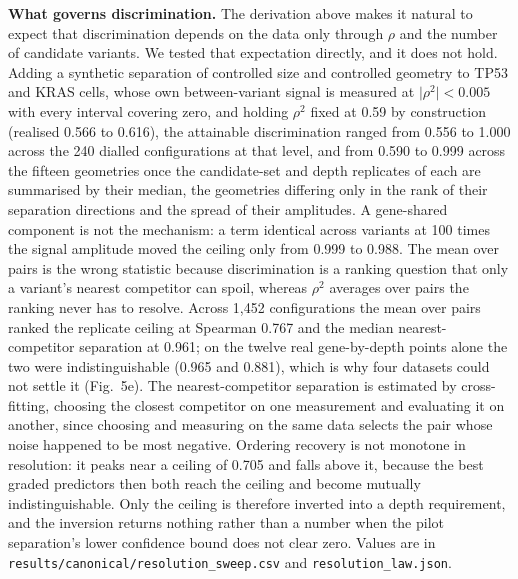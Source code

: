 \documentclass[11pt,letterpaper]{article}
\begin{document}
\textbf{What governs discrimination.} The derivation above makes it natural to expect that discrimination depends on the data only through $\rho$ and the number of candidate variants. We tested that expectation directly, and it does not hold. Adding a synthetic separation of controlled size and controlled geometry to TP53 and KRAS cells, whose own between-variant signal is measured at $\lvert\rho^2\rvert < 0.005$ with every interval covering zero, and holding $\rho^2$ fixed at 0.59 by construction (realised 0.566 to 0.616), the attainable discrimination ranged from 0.556 to 1.000 across the 240 dialled configurations at that level, and from 0.590 to 0.999 across the fifteen geometries once the candidate-set and depth replicates of each are summarised by their median, the geometries differing only in the rank of their separation directions and the spread of their amplitudes. A gene-shared component is not the mechanism: a term identical across variants at 100 times the signal amplitude moved the ceiling only from 0.999 to 0.988. The mean over pairs is the wrong statistic because discrimination is a ranking question that only a variant's nearest competitor can spoil, whereas $\rho^2$ averages over pairs the ranking never has to resolve. Across 1,452 configurations the mean over pairs ranked the replicate ceiling at Spearman 0.767 and the median nearest-competitor separation at 0.961; on the twelve real gene-by-depth points alone the two were indistinguishable (0.965 and 0.881), which is why four datasets could not settle it (Fig.~5e). The nearest-competitor separation is estimated by cross-fitting, choosing the closest competitor on one measurement and evaluating it on another, since choosing and measuring on the same data selects the pair whose noise happened to be most negative. Ordering recovery is not monotone in resolution: it peaks near a ceiling of 0.705 and falls above it, because the best graded predictors then both reach the ceiling and become mutually indistinguishable. Only the ceiling is therefore inverted into a depth requirement, and the inversion returns nothing rather than a number when the pilot separation's lower confidence bound does not clear zero. Values are in \texttt{results/canonical/resolution\_sweep.csv} and \texttt{resolution\_law.json}.
\end{document}
